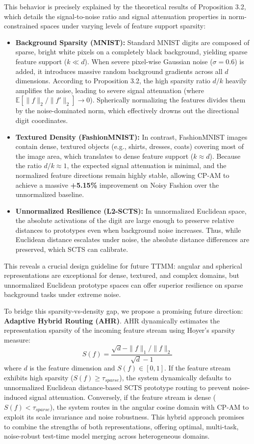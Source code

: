\documentclass{article}
\theoremstyle{plain}
\theoremstyle{definition}
\theoremstyle{remark}
\begin{document}
This behavior is precisely explained by the theoretical results of Proposition 3.2, which details the signal-to-noise ratio and signal attenuation properties in norm-constrained spaces under varying levels of feature support sparsity:
\begin{itemize}
\item \textbf{Background Sparsity (MNIST):} Standard MNIST digits are composed of sparse, bright white pixels on a completely black background, yielding sparse feature support ($k \ll d$). When severe pixel-wise Gaussian noise ($\sigma = 0.6$) is added, it introduces massive random background gradients across all $d$ dimensions. According to Proposition 3.2, the high sparsity ratio $d/k$ heavily amplifies the noise, leading to severe signal attenuation (where $\mathbb{E}[\|f\|_2/\|f'\|_2] \to 0$). Spherically normalizing the features divides them by the noise-dominated norm, which effectively drowns out the directional digit coordinates.
\item \textbf{Textured Density (FashionMNIST):} In contrast, FashionMNIST images contain dense, textured objects (e.g., shirts, dresses, coats) covering most of the image area, which translates to dense feature support ($k \approx d$). Because the ratio $d/k \approx 1$, the expected signal attenuation is minimal, and the normalized feature directions remain highly stable, allowing CP-AM to achieve a massive \textbf{+5.15\%} improvement on Noisy Fashion over the unnormalized baseline.
\item \textbf{Unnormalized Resilience (L2-SCTS):} In unnormalized Euclidean space, the absolute activations of the digit are large enough to preserve relative distances to prototypes even when background noise increases. Thus, while Euclidean distance escalates under noise, the absolute distance differences are preserved, which SCTS can calibrate.
\end{itemize}
This reveals a crucial design guideline for future TTMM: angular and spherical representations are exceptional for dense, textured, and complex domains, but unnormalized Euclidean prototype spaces can offer superior resilience on sparse background tasks under extreme noise.

To bridge this sparsity-vs-density gap, we propose a promising future direction: \textbf{Adaptive Hybrid Routing (AHR)}. AHR dynamically estimates the representation sparsity of the incoming feature stream using Hoyer's sparsity measure:
\begin{equation}
S(f) = \frac{\sqrt{d} - \|f\|_1 / \|f\|_2}{\sqrt{d} - 1}
\end{equation}
where $d$ is the feature dimension and $S(f) \in [0, 1]$. If the feature stream exhibits high sparsity ($S(f) \ge \tau_{sparse}$), the system dynamically defaults to unnormalized Euclidean distance-based SCTS prototype routing to prevent noise-induced signal attenuation. Conversely, if the feature stream is dense ($S(f) < \tau_{sparse}$), the system routes in the angular cosine domain with CP-AM to exploit its scale invariance and noise robustness. This hybrid approach promises to combine the strengths of both representations, offering optimal, multi-task, noise-robust test-time model merging across heterogeneous domains.
\end{document}
